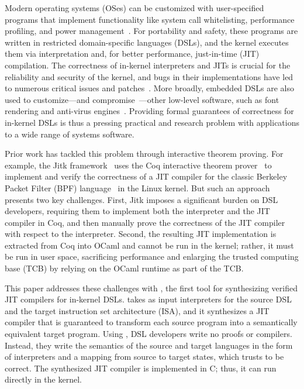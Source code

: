 Modern operating systems (OSes) can be customized with user-specified programs
that implement functionality like system call whitelisting, performance
profiling, and power management~\cite{engler:vcode,fleming:ebpf,mccanne:bpf}.
For portability and safety, these programs are written in restricted
domain-specific languages (DSLs), and the kernel executes them via
interpretation and, for better performance, just-in-time (JIT) compilation. The
correctness of in-kernel interpreters and JITs is crucial for the reliability
and security of the kernel, and bugs in their implementations have led to
numerous critical issues and patches~\cite{gpz:1454,paul:cve-2020-8835}.
More broadly, embedded DSLs are
also used to customize---and compromise~\cite{blazakis:jit-spraying,kocher:spectre}---other low-level software, such as font
rendering and anti-virus engines~\cite{chen:vmsec}. Providing formal guarantees
of correctness for in-kernel DSLs is thus a pressing practical and research
problem with applications to a wide range of systems software.\tighten

Prior work has tackled this problem through interactive theorem proving. For
example, the Jitk framework~\cite{wang:jitk} uses the Coq interactive theorem
prover~\cite{coq} to implement and verify the correctness of a JIT compiler for
the classic Berkeley Packet Filter (BPF) language~\cite{mccanne:bpf} in the
Linux kernel. But such an approach presents two key challenges. First, Jitk
imposes a significant burden on DSL developers, requiring them to implement both
the interpreter and the JIT compiler in Coq, and then manually prove the
correctness of the JIT compiler with respect to the interpreter. Second, the
resulting JIT implementation is extracted from Coq into OCaml and cannot be run
in the kernel; rather, it must be run in user space, sacrificing performance and
enlarging the trusted computing base (TCB) by relying on the OCaml runtime as
part of the TCB\@.\tighten

This paper addresses these challenges with \jitsynth, the first tool for
synthesizing verified JIT compilers for in-kernel DSLs. \jitsynth takes as input
interpreters for the source DSL and the target instruction set architecture
(ISA), and it synthesizes a JIT compiler that is guaranteed to transform each
source program into a semantically equivalent target program. Using \jitsynth,
DSL developers write no proofs or compilers.
Instead, they write the semantics of the source and target
languages in the form of interpreters and a mapping from source to target states,
which \jitsynth trusts to be correct. The
synthesized JIT compiler is implemented in C; thus, it can run directly in the
kernel.\tighten

